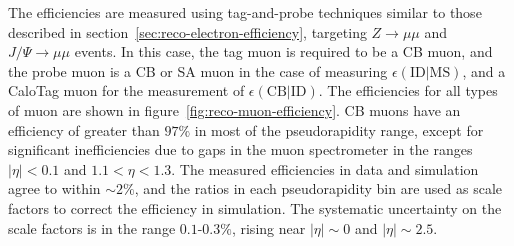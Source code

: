 The efficiencies are measured using tag-and-probe techniques similar to those described in section~\ref{sec:reco-electron-efficiency}, targeting $Z\rightarrow\mu\mu$ and $J/\Psi\rightarrow\mu\mu$ events. In this case, the tag muon is required to be a CB muon, and the probe muon is a CB or SA muon in the case of measuring $\epsilon(\mathrm{ID}|\mathrm{MS})$, and a CaloTag muon for the measurement of $\epsilon(\mathrm{CB}|\mathrm{ID})$. The efficiencies for all types of muon are shown in figure~\ref{fig:reco-muon-efficiency}. CB muons have an efficiency of greater than $97\%$ in most of the pseudorapidity range, except for significant inefficiencies due to gaps in the muon spectrometer in the ranges $|\eta|<0.1$ and $1.1<\eta<1.3$. The measured efficiencies in data and simulation agree to within $\sim2\%$, and the ratios in each pseudorapidity bin are used as scale factors to correct the efficiency in simulation. The systematic uncertainty on the scale factors is in the range $0.1$-$0.3\%$, rising near $|\eta|\sim 0$ and $|\eta|\sim 2.5$.

